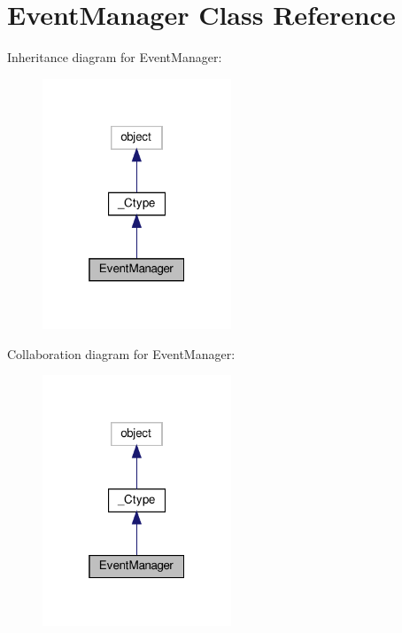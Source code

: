 \hypertarget{classvlc_1_1_event_manager}{}\section{Event\+Manager Class Reference}
\label{classvlc_1_1_event_manager}


Inheritance diagram for Event\+Manager\+:
\nopagebreak
\begin{figure}[H]
\begin{center}
\leavevmode
\includegraphics[width=160pt]{classvlc_1_1_event_manager__inherit__graph}
\end{center}
\end{figure}


Collaboration diagram for Event\+Manager\+:
\nopagebreak
\begin{figure}[H]
\begin{center}
\leavevmode
\includegraphics[width=160pt]{classvlc_1_1_event_manager__coll__graph}
\end{center}
\end{figure}

